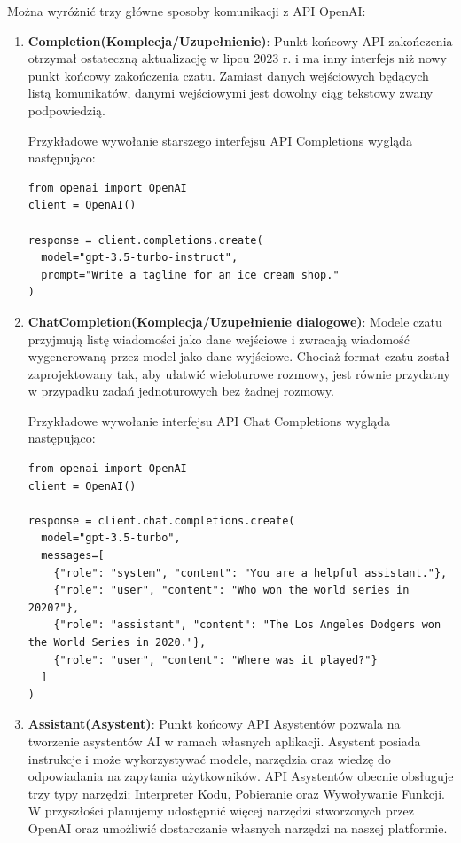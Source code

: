 Można wyróżnić trzy główne sposoby komunikacji z API OpenAI:
\begin{enumerate}
    \item \textbf{Completion(Komplecja/Uzupełnienie)}: Punkt końcowy API zakończenia otrzymał ostateczną aktualizację w lipcu 2023 r. i ma inny interfejs niż nowy punkt końcowy zakończenia czatu. Zamiast danych wejściowych będących listą komunikatów, danymi wejściowymi jest dowolny ciąg tekstowy zwany podpowiedzią.

    Przykładowe wywołanie starszego interfejsu API Completions wygląda następująco:
    \begin{listing}
        \begin{verbatim}
from openai import OpenAI
client = OpenAI()

response = client.completions.create(
  model="gpt-3.5-turbo-instruct",
  prompt="Write a tagline for an ice cream shop."
)
        \end{verbatim}
    \end{listing}
    \item \textbf{ChatCompletion(Komplecja/Uzupełnienie dialogowe)}: Modele czatu przyjmują listę wiadomości jako dane wejściowe i zwracają wiadomość wygenerowaną przez model jako dane wyjściowe. Chociaż format czatu został zaprojektowany tak, aby ułatwić wieloturowe rozmowy, jest równie przydatny w przypadku zadań jednoturowych bez żadnej rozmowy.

    Przykładowe wywołanie interfejsu API Chat Completions wygląda następująco:
    \begin{listing}
        \begin{verbatim}
from openai import OpenAI
client = OpenAI()

response = client.chat.completions.create(
  model="gpt-3.5-turbo",
  messages=[
    {"role": "system", "content": "You are a helpful assistant."},
    {"role": "user", "content": "Who won the world series in 2020?"},
    {"role": "assistant", "content": "The Los Angeles Dodgers won the World Series in 2020."},
    {"role": "user", "content": "Where was it played?"}
  ]
)
            \end{verbatim}
        \end{listing}
        \item \textbf{Assistant(Asystent)}: Punkt końcowy API Asystentów pozwala na tworzenie asystentów AI w ramach własnych aplikacji. Asystent posiada instrukcje i może wykorzystywać modele, narzędzia oraz wiedzę do odpowiadania na zapytania użytkowników. API Asystentów obecnie obsługuje trzy typy narzędzi: Interpreter Kodu, Pobieranie oraz Wywoływanie Funkcji. W przyszłości planujemy udostępnić więcej narzędzi stworzonych przez OpenAI oraz umożliwić dostarczanie własnych narzędzi na naszej platformie.
        

\end{enumerate}
